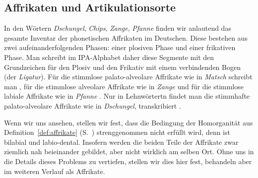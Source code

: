\subsection{Affrikaten und Artikulationsorte}

\label{sec:affrikatenhomorgan}


In den Wörtern \textit{Dschungel}, \textit{Chips}, \textit{Zange}, \textit{Pfanne} finden wir anlautend das gesamte Inventar der phonetischen Affrikaten im Deutschen.
Diese bestehen aus zwei aufeinanderfolgenden Phasen: einer plosiven Phase und einer frikativen Phase.
Man schreibt im IPA-Alphabet daher diese Segmente mit den Grundzeichen für den Plosiv und den Frikativ mit einem verbindenden Bogen (der \textit{Ligatur}).
Für die stimmlose palato-alveolare Affrikate wie in \textit{Matsch} schreibt man \textipa{[\t{tS}]}, für die stimmlose alveolare Affrikate wie in \textit{Zange} \textipa{[\t{ts}]} und für die stimmlose labiale Affrikate wie in \textit{Pfanne} \textipa{[\t{pf}]}.
Nur in Lehnwörtertn findet man die stimmhafte palato-alveolare Affrikate wie in \textit{Dschungel}, transkribiert \textipa{[\t{dZ}]}.

Wenn wir uns \textipa{[\t{pf}]} ansehen, stellen wir fest, dass die Bedingung der Homorganität aus Definition~\ref{def:affrikate} (S.~\pageref{def:affrikate}) strenggenommen nicht erfüllt wird, denn \textipa{[p]} ist bilabial und \textipa{[f]} labio-dental.
Insofern werden die beiden Teile der Affrikate zwar ziemlich nah beieinander gebildet, aber nicht wirklich am selben Ort.
Ohne uns in die Details dieses Problems zu vertiefen, stellen wir dies hier fest, behandeln \textipa{[\t{pf}]} aber im weiteren Verlauf als Affrikate.

